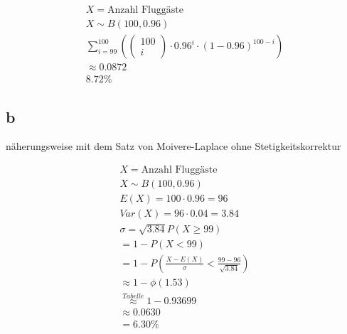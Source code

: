 \begin{align*}
    X = \text{Anzahl Fluggäste}                                                              \\
    X \sim B(100, 0.96)                                                                      \\
    \sum_{i = 99}^{100} \left(\begin{pmatrix}
                                      100 \\ i
                                  \end{pmatrix} \cdot 0.96^i \cdot {(1 - 0.96)}^{100 - i}\right) \\
    \approx 0.0872                                                                           \\
    8.72\%
\end{align*}

\subsection{b}

näherungsweise mit dem Satz von Moivere-Laplace ohne Stetigkeitskorrektur

\begin{align*}
    X = \text{Anzahl Fluggäste}                                               \\
    X \sim B(100, 0.96)                                                       \\
    E(X) = 100 \cdot 0.96 = 96                                                \\
    Var(X) = 96 \cdot 0.04 = 3.84                                             \\
    \sigma = \sqrt{3.84}
    P(X \geq 99)                                                              \\
    = 1 - P(X < 99)                                                           \\
    = 1 - P\left(\frac{X - E(X)}{\sigma} < \frac{99 - 96}{\sqrt{3.84}}\right) \\
    \approx 1 - \phi(1.53)                                                    \\
    \overset{Tabelle}{\approx} 1 - 0.93699                                    \\
    \approx 0.0630                                                            \\
    = 6.30\%
\end{align*}

